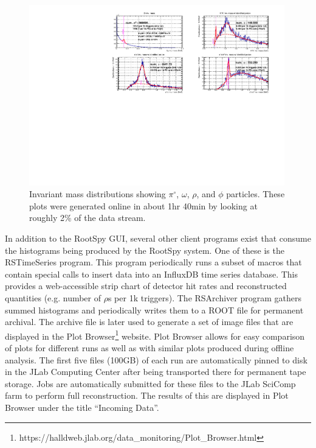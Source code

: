 \begin{figure}[tbp]
\begin{center}
\includegraphics[width=0.99\textwidth, clip,trim=0.6cm 0.0cm 1.1cm 0.0cm]{figures/online_monitoring_PID.pdf}
\caption{\label{fig:online_monitoring_PID}Invariant mass distributions showing $\pi^\circ$, $\omega$, $\rho$, and $\phi$ particles. These plots were generated online in about 1hr 40min by looking at roughly 2\% of the data stream.}   
\end{center}  
\end{figure}

In addition to the RootSpy GUI, several other client programs exist that consume the histograms being produced by the RootSpy system. One of these is the RSTimeSeries program. This program periodically runs a subset of macros that contain special calls to insert data into an InfluxDB time series database. This provides a web-accessible strip chart of detector hit rates and reconstructed quantities (e.g. number of $\rho$s per 1k triggers). The RSArchiver program gathers summed histograms and periodically writes them to a ROOT file for permanent archival. The archive file is later used to generate a set of image files that are displayed in the Plot Browser\footnote{https://halldweb.jlab.org/data\_monitoring/Plot\_Browser.html} website. Plot Browser allows for easy comparison of plots for different runs as well as with similar plots produced during offline analysis. The first five files (100GB) of each run are automatically pinned to disk in the JLab Computing Center after being transported there for permanent tape storage. Jobs are automatically submitted for these files to the JLab SciComp farm to perform full reconstruction. The results of this are displayed in Plot Browser under the title ``Incoming Data''.


